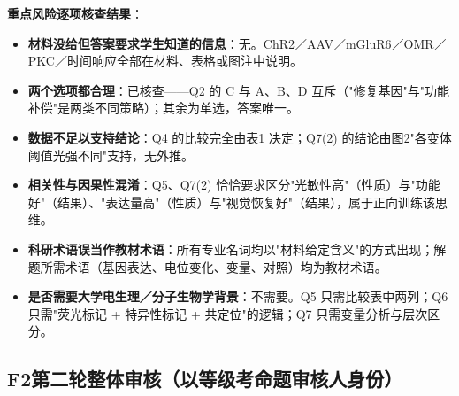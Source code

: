 \documentclass[UTF8,a4paper,11pt]{ctexart}
\begin{document}
\noindent\textbf{重点风险逐项核查结果}：
\begin{itemize}[leftmargin=1.6em,itemsep=2pt]
\item \textbf{材料没给但答案要求学生知道的信息}：无。ChR2／AAV／mGluR6／OMR／PKC／时间响应全部在材料、表格或图注中说明。
\item \textbf{两个选项都合理}：已核查——Q2 的 C 与 A、B、D 互斥（"修复基因"与"功能补偿"是两类不同策略）；其余为单选，答案唯一。
\item \textbf{数据不足以支持结论}：Q4 的比较完全由表1 决定；Q7(2) 的结论由图2"各变体阈值光强不同"支持，无外推。
\item \textbf{相关性与因果性混淆}：Q5、Q7(2) 恰恰要求区分"光敏性高"（性质）与"功能好"（结果）、"表达量高"（性质）与"视觉恢复好"（结果），属于正向训练该思维。
\item \textbf{科研术语误当作教材术语}：所有专业名词均以"材料给定含义"的方式出现；解题所需术语（基因表达、电位变化、变量、对照）均为教材术语。
\item \textbf{是否需要大学电生理／分子生物学背景}：不需要。Q5 只需比较表中两列；Q6 只需"荧光标记 + 特异性标记 + 共定位"的逻辑；Q7 只需变量分析与层次区分。
\end{itemize}

\subsection*{F2\quad 第二轮整体审核（以等级考命题审核人身份）}
\end{document}
